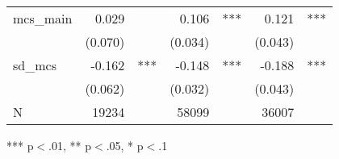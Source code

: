 \begin{table}[!h]
\begin{tabular}{lllllll}
\multicolumn{1}{l}{mcs\_main} &
  \multicolumn{1}{r}{0.029} &
  \multicolumn{1}{l}{} &
  \multicolumn{1}{r}{0.106} &
  \multicolumn{1}{l}{***} &
  \multicolumn{1}{r}{0.121} &
  \multicolumn{1}{l}{***} \\
\multicolumn{1}{l}{} &
  \multicolumn{1}{r}{(0.070)} &
  \multicolumn{1}{l}{} &
  \multicolumn{1}{r}{(0.034)} &
  \multicolumn{1}{l}{} &
  \multicolumn{1}{r}{(0.043)} &
  \multicolumn{1}{l}{} \\
\multicolumn{1}{l}{sd\_mcs} &
  \multicolumn{1}{r}{-0.162} &
  \multicolumn{1}{l}{***} &
  \multicolumn{1}{r}{-0.148} &
  \multicolumn{1}{l}{***} &
  \multicolumn{1}{r}{-0.188} &
  \multicolumn{1}{l}{***} \\
\multicolumn{1}{l}{} &
  \multicolumn{1}{r}{(0.062)} &
  \multicolumn{1}{l}{} &
  \multicolumn{1}{r}{(0.032)} &
  \multicolumn{1}{l}{} &
  \multicolumn{1}{r}{(0.043)} &
  \multicolumn{1}{l}{} \\
\multicolumn{1}{l}{N} &
  \multicolumn{1}{r}{19234} &
  \multicolumn{1}{l}{} &
  \multicolumn{1}{r}{58099} &
  \multicolumn{1}{l}{} &
  \multicolumn{1}{r}{36007} &
  \multicolumn{1}{l}{} \\
\cline{1-7}
\end{tabular}

\footnotesize{
*** p$<$.01, ** p$<$.05, * p$<$.1
}
\end{table}